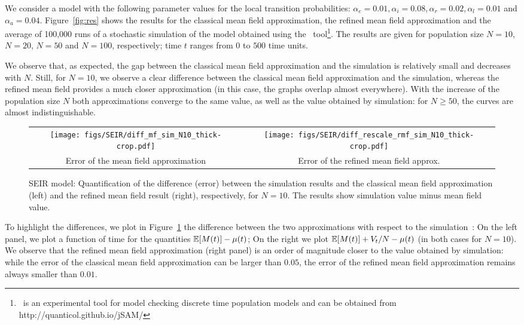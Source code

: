 \documentclass[review]{elsarticle}
\begin{document}
We consider a model with the following parameter values for the local
transition probabilities:
$\alpha_e=0.01, \alpha_i=0.08,\alpha_r=0.02,\alpha_l=0.01$ and
$\alpha_a=0.04$. Figure~\ref{fig:res} shows the results for the
classical mean field approximation, the refined mean field
approximation and the average of 100,000 runs of a stochastic
simulation of the model obtained using the \FlyFast\
tool\footnote{\FlyFast\ is an experimental tool for model checking
  discrete time population models and can be obtained from
  http://quanticol.github.io/jSAM/}. The results are given for
population size $N=10$, $N=20$, $N=50$ and $N=100$, respectively;
time $t$ ranges from $0$ to $500$ time units.

We observe that, as expected, the gap between the classical mean field
approximation and the simulation is relatively small and decreases
with $N$. Still, for $N=10$, we observe a clear difference between the
classical mean field approximation and the simulation, whereas the
refined mean field provides a much closer approximation (in this case,
the graphs overlap almost everywhere). With the increase of the
population size $N$ both approximations converge to the same value, as
well as the value obtained by simulation: for $N\ge50$, the curves
are almost indistinguishable.


\begin{figure}[ht]
  \begin{center}
    \begin{tabular}{cc}
      \texttt{[image: figs/SEIR/diff\_mf\_sim\_N10\_thick-crop.pdf]}
      &\texttt{[image: figs/SEIR/diff\_rescale\_rmf\_sim\_N10\_thick-crop.pdf]}\\
      Error of the mean field approximation
      &
      Error of the refined mean field approx.
    \end{tabular}
\end{center}
\caption{\label{fig:diff} SEIR model: Quantification of the
  difference (error) between the simulation results and the classical
  mean field approximation (left) and the refined mean field result
  (right), respectively, for $N=10$. The results show simulation value
  minus mean field value.}
\end{figure}


To highlight the differences, we plot in Figure~\ref{fig:diff} the
difference between the two approximations with respect to the
simulation~: On the left panel, we plot a function of time for the
quantities $\esp{M(t)}-\mu(t)$; On the right we plot
$\esp{M(t)}+V_t/N-\mu(t)$ (in both cases for $N=10$). We observe that
the refined mean field approximation (right panel) is an order of
magnitude closer to the value obtained by simulation: while the error
of the classical mean field approximation can be larger than $0.05$,
the error of the refined mean field approximation remains always
smaller than $0.01$. 
\end{document}
